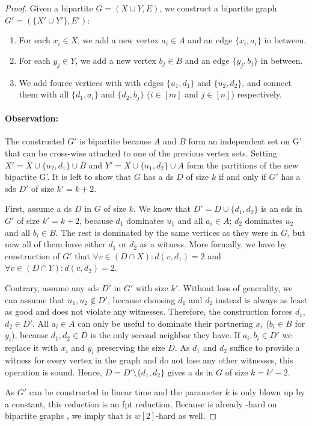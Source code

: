 \begin{proof}
    Given a bipartite $G = ( X \cup Y, E)$, we construct a bipartite graph $G' = (\{X' \cup Y'\},E')$:
    \begin{enumerate}[topsep=0pt,itemsep=-1ex,partopsep=1ex,parsep=1ex]
        \item For each $x_i \in X$, we add a new vertex $a_i \in A$  and an edge $\{x_i, a_i\}$ in between. 
        \item For each $y_j \in Y$, we add a new vertex $b_j \in B$ and an edge $\{y_j, b_j\}$ in between.
        \item We add fource vertices with with edges $\{u_1, d_1\}$ and $\{u_2, d_2\}$, and connect them with all $\{d_1, a_i\}$ and $\{d_2, b_j\}$ ($i \in [m]$ and $j \in [n]$) respectively.
    \end{enumerate}
    \paragraph*{Observation:} The constructed $G'$ is bipartite because $A$ and $B$ form an independent set on G' that can be cross-wise attached to one of the previous vertex sets. Setting  $X' = X \cup \{u_2,d_1\} \cup B$ and $Y' = X \cup \{u_1,d_2\} \cup A$ form the partitions of the new bipartite G'.
    It is left to show that $G$ has a ds $D$ of size $k$ if and only if $G'$ has a sds $D'$ of size $k' = k + 2$.
 
    First, assume a ds $D$ in $G$ of size $k$. 
    We know that $D' = D\cup \{d_1,d_2\}$ is an sds in $G'$ of size $k' = k + 2$, because $d_1$ dominates $u_1$ and all $a_i \in A$; $d_2$ dominates $u_2$ and all $b_i \in B$. 
    The rest is dominated by the same vertices as they were in $G$, but now all of them have either $d_1$ or $d_2$ as a witness.
    More formally, we have by construction of $G'$ that $\forall v \in (D \cap X): d(v, d_1) = 2$ and $\forall v \in (D \cap Y): d(v, d_2) = 2$.

    Contrary, assume any sds $D'$ in $G'$ with size $k'$. Without loss of generality, we can assume that $u_1, u_2 \notin D'$, because choosing $d_1$ and $d_2$ instead is always as least as good and does not violate any witnesses. Therefore, the construction forces $d_1$, $d_2 \in D'$. 
    All $a_i \in A$ can only be useful to dominate their partnering $x_i$ ($b_i \in B$ for $y_i$), because $d_1, d_2 \in D$ is the only second neighbor they have.
    If $a_i,b_i \in D'$ we replace it with $x_i$ and $y_i$ preserving the size $D$. As $d_1$ and $d_2$ suffice to provide a witness for every vertex in the graph and do not lose any other witnesses, this operation is sound.
    Hence, $D = D' \setminus \{ d_1,d_2\}$ gives a ds in $G$ of size $ k = k' - 2$.
    
    As $G'$ can be constructed in linear time and the parameter $k$ is only blown up by a constant, this reduction is an fpt reduction.  
    Because \dom is already \WTWOhs-hard on bipartite graphs \cite[Th. 1]{Raman2008}, we imply that \sdom is $w[2]$-hard as well.
\end{proof}

